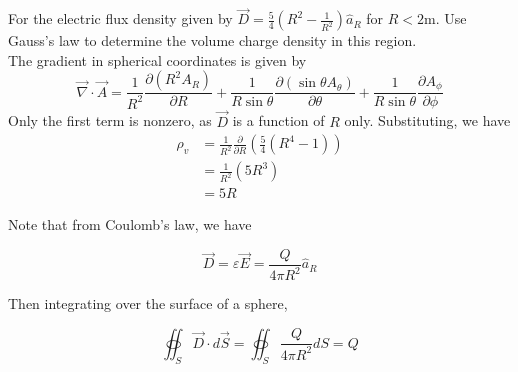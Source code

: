 \documentclass[12pt]{article}
\begin{document}
\begin{ex}
	For the electric flux density given by $\vec{D} = \frac{5}{4}\left(R^2-\frac{1}{R^2}\right)\hat{a}_R$ for $R<2$m. Use Gauss's law to determine the volume charge density in this region. \\
	The gradient in spherical coordinates is given by
	$$\vec{\nabla}\cdot\vec{A} = \frac{1}{R^2}\frac{\partial(R^2A_R)}{\partial R} + \frac{1}{R\sin\theta}\frac{\partial(\sin\theta A_\theta)}{\partial \theta} + \frac{1}{R\sin\theta}\frac{\partial A_\phi}{\partial \phi}$$
	Only the first term is nonzero, as $\vec{D}$ is a function of $R$ only. Substituting, we have
	\begin{align*}
		\rho_v &= \frac{1}{R^2}\frac{\partial}{\partial R} \left(\frac{5}{4}(R^4-1)\right) \\
		       &= \frac{1}{R^2} (5R^3) \\
		       &= 5R
	\end{align*}
\end{ex}

Note that from Coulomb's law, we have

$$\vec{D} = \varepsilon\vec{E} = \frac{Q}{4\pi R^2}\hat{a}_R$$

Then integrating over the surface of a sphere,

$$\oiint_S \vec{D}\cdot d\vec{S} = \oiint_S \frac{Q}{4\pi R^2} dS = Q$$
\end{document}
